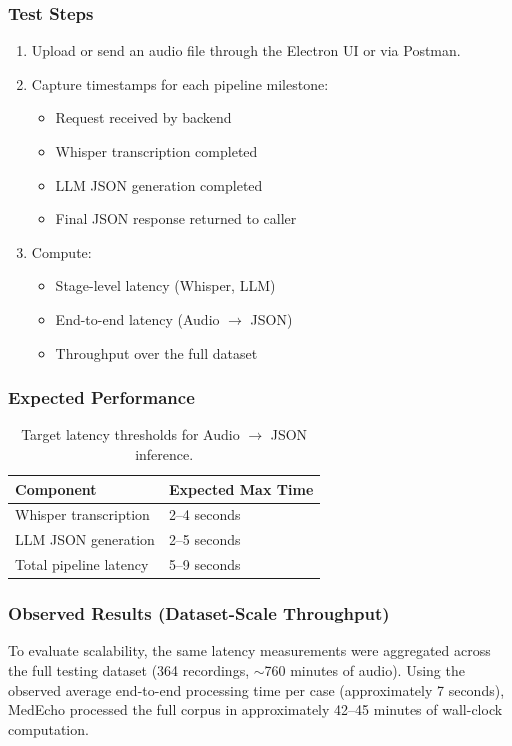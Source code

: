 \subsubsection*{Test Steps}
\begin{enumerate}
    \item Upload or send an audio file through the Electron UI or via Postman.
    \item Capture timestamps for each pipeline milestone:
    \begin{itemize}
        \item Request received by backend
        \item Whisper transcription completed
        \item LLM JSON generation completed
        \item Final JSON response returned to caller
    \end{itemize}
    \item Compute:
    \begin{itemize}
        \item Stage-level latency (Whisper, LLM)
        \item End-to-end latency (Audio $\rightarrow$ JSON)
        \item Throughput over the full dataset
    \end{itemize}
\end{enumerate}

\subsubsection*{Expected Performance}
\begin{table}[H]
\centering
\renewcommand{\arraystretch}{1.25}
\begin{tabular}{|p{5.5cm}|p{4.5cm}|}
\hline
\textbf{Component} & \textbf{Expected Max Time} \\ \hline
Whisper transcription & 2--4 seconds \\ \hline
LLM JSON generation & 2--5 seconds \\ \hline
Total pipeline latency & 5--9 seconds \\ \hline
\end{tabular}
\caption{Target latency thresholds for Audio $\rightarrow$ JSON inference.}
\label{tab:expected-latency}
\end{table}

\subsubsection*{Observed Results (Dataset-Scale Throughput)}
To evaluate scalability, the same latency measurements were aggregated across the full
testing dataset (364 recordings, $\sim$760 minutes of audio). Using the observed average
end-to-end processing time per case (approximately 7 seconds), MedEcho processed the full
corpus in approximately 42--45 minutes of wall-clock computation.


